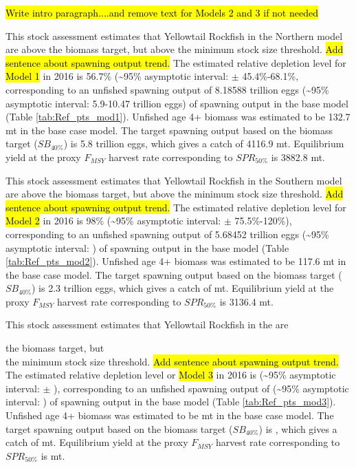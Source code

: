 \documentclass[12pt,]{article}
\begin{document}
\hl{Write intro paragraph....and remove text for Models 2 and 3 if not needed}

This stock assessment estimates that Yellowtail Rockfish in the Northern
model are above the biomass target, but above the minimum stock size
threshold. \hl{Add sentence about spawning output trend.} The estimated
relative depletion level for \hl{Model 1} in 2016 is 56.7\%
(\textasciitilde{}95\% asymptotic interval: \(\pm\) 45.4\%-68.1\%,
corresponding to an unfished spawning output of 8.18588 trillion eggs
(\textasciitilde{}95\% asymptotic interval: 5.9-10.47 trillion eggs) of
spawning output in the base model (Table \ref{tab:Ref_pts_mod1}).
Unfished age 4+ biomass was estimated to be 132.7 mt in the base case
model. The target spawning output based on the biomass target
(\(SB_{40\%}\)) is 5.8 trillion eggs, which gives a catch of 4116.9 mt.
Equilibrium yield at the proxy \(F_{MSY}\) harvest rate corresponding to
\(SPR_{50\%}\) is 3882.8 mt.

This stock assessment estimates that Yellowtail Rockfish in the Southern
model are above the biomass target, but above the minimum stock size
threshold. \hl{Add sentence about spawning output trend.} The estimated
relative depletion level for \hl{Model 2} in 2016 is 98\%
(\textasciitilde{}95\% asymptotic interval: \(\pm\) 75.5\%-120\%),
corresponding to an unfished spawning output of 5.68452 trillion eggs
(\textasciitilde{}95\% asymptotic interval: ) of spawning output in the
base model (Table \ref{tab:Ref_pts_mod2}). Unfished age 4+ biomass was
estimated to be 117.6 mt in the base case model. The target spawning
output based on the biomass target (\(SB_{40\%}\)) is 2.3 trillion eggs,
which gives a catch of mt. Equilibrium yield at the proxy \(F_{MSY}\)
harvest rate corresponding to \(SPR_{50\%}\) is 3136.4 mt.

This stock assessment estimates that Yellowtail Rockfish in the are

the biomass target, but\\
the minimum stock size threshold.
\hl{Add sentence about spawning output trend.} The estimated relative
depletion level or \hl{Model 3} in 2016 is (\textasciitilde{}95\%
asymptotic interval: \(\pm\) ), corresponding to an unfished spawning
output of (\textasciitilde{}95\% asymptotic interval: ) of spawning
output in the base model (Table \ref{tab:Ref_pts_mod3}). Unfished age 4+
biomass was estimated to be mt in the base case model. The target
spawning output based on the biomass target (\(SB_{40\%}\)) is , which
gives a catch of mt. Equilibrium yield at the proxy \(F_{MSY}\) harvest
rate corresponding to \(SPR_{50\%}\) is mt.
\end{document}
